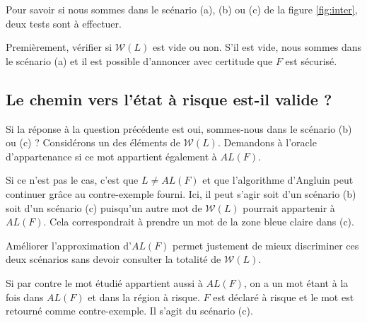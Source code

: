 Pour savoir si nous sommes dans le scénario (a), (b) ou (c) de la figure \ref{fig:inter}, deux tests sont à effectuer.

Premièrement, vérifier si $\mathcal{W}(L)$ est vide ou non. S'il est vide, nous sommes dans le scénario (a) et il est possible d'annoncer avec certitude que $F$ est sécurisé.

\subsection*{Le chemin vers l'état à risque est-il valide ?}

Si la réponse à la question précédente est oui, sommes-nous dans le scénario (b) ou (c) ?
Considérons un des éléments de $\mathcal{W}(L)$. Demandons à l'oracle d'appartenance si ce mot appartient également à $AL(F)$.

Si ce n'est pas le cas, c'est que $L\neq AL(F)$ et que l'algorithme d'Angluin peut continuer grâce au contre-exemple fourni. Ici, il peut s'agir soit d'un scénario (b) soit d'un scénario (c) puisqu'un autre mot de $\mathcal{W}(L)$ pourrait appartenir à $AL(F)$. Cela correspondrait à prendre un mot de la zone bleue claire dans (c).

Améliorer l'approximation d'$AL(F)$ permet justement de mieux discriminer ces deux scénarios sans devoir consulter la totalité de $\mathcal{W}(L)$.

Si par contre le mot étudié appartient aussi à $AL(F)$, on a un mot étant à la fois dans $AL(F)$ et dans la région à risque. $F$ est déclaré à risque et le mot est retourné comme contre-exemple. Il s'agit du scénario (c).
